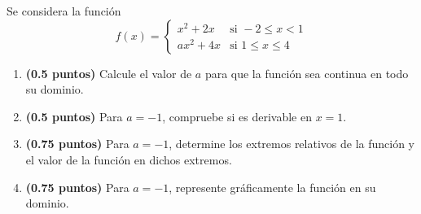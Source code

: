 
Se considera la función
\[
  f(x)=\begin{cases}
    x^2+2x & \text{si } -2\leq x<1 \\[0.5em]
    ax^2+4x & \text{si } 1\leq x\leq 4
  \end{cases}
\]

\begin{enumerate}[label=\alph*)]
  \item \textbf{(0.5 puntos)} Calcule el valor de $a$ para que la función sea
  continua en todo su dominio.
  \item \textbf{(0.5 puntos)} Para $a=-1$, compruebe si es derivable en
  $x=1$.
  \item \textbf{(0.75 puntos)} Para $a=-1$, determine los extremos relativos
  de la función y el valor de la función en dichos extremos.
  \item \textbf{(0.75 puntos)} Para $a=-1$, represente gráficamente la
  función en su dominio.
\end{enumerate}
